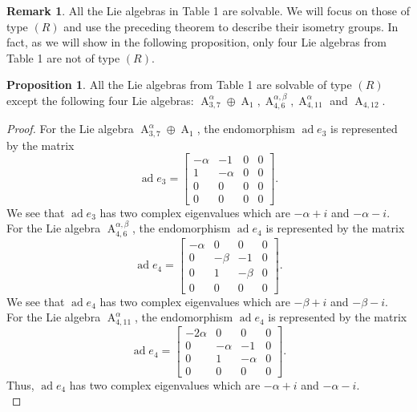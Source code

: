 \documentclass[12pt,a4paper,twoside]{article}
\theoremstyle{definition}
\newtheorem{proposition}{Proposition}[section]
\newtheorem{remark}[theorem]{Remark}
\begin{document}
\begin{remark}
All the Lie algebras in Table 1 are solvable. We will focus on those of type $(R)$ and use the preceding theorem to describe their isometry groups. In fact, as we will show in the following proposition, only four Lie algebras from Table 1 are not of type $(R)$.
\end{remark}
\begin{proposition}
All the Lie algebras from Table 1 are solvable of type $(R)$ except the following four Lie algebras: $\operatorname{A}_{3, 7}^{\alpha} \oplus \operatorname{A}_1, \operatorname{A}_{4, 6}^{\alpha, \beta}, \operatorname{A}_{4, 11}^{\alpha}$ and $\operatorname{A}_{4, 12}$.
\end{proposition}
\begin{proof}
For the Lie algebra $\operatorname{A}_{3, 7}^{\alpha} \oplus \operatorname{A}_1$, the endomorphism $\operatorname{ad} e_3$ is represented by the matrix
$$\operatorname{ad} e_3 = \begin{bmatrix}
-\alpha & -1 & 0 & 0\\
1 & -\alpha & 0 & 0\\
0 & 0 & 0 & 0\\
0 & 0 & 0 & 0
\end{bmatrix}.$$
We see that $\operatorname{ad} e_3$ has two complex eigenvalues which are $-\alpha + i$ and $-\alpha - i$.\\
For the Lie algebra $\operatorname{A}_{4, 6}^{\alpha, \beta}$, the endomorphism $\operatorname{ad} e_4$ is represented by the matrix
$$\operatorname{ad} e_4 = \begin{bmatrix}
-\alpha & 0 & 0 & 0\\
0 & -\beta & -1 & 0\\
0 & 1 & -\beta & 0\\
0 & 0 & 0 & 0
\end{bmatrix}.$$
We see that $\operatorname{ad} e_4$ has two complex eigenvalues which are $-\beta + i$ and $-\beta - i$.\\
For the Lie algebra $\operatorname{A}_{4, 11}^{\alpha}$, the endomorphism $\operatorname{ad} e_4$ is represented by the matrix
$$\operatorname{ad} e_4 = \begin{bmatrix}
-2\alpha & 0 & 0 & 0\\
0 & -\alpha & -1 & 0\\
0 & 1 & -\alpha & 0\\
0 & 0 & 0 & 0
\end{bmatrix}.$$
Thus, $\operatorname{ad} e_4$ has two complex eigenvalues which are $-\alpha + i$ and $-\alpha - i$.\\

\end{proof}
\end{document}
